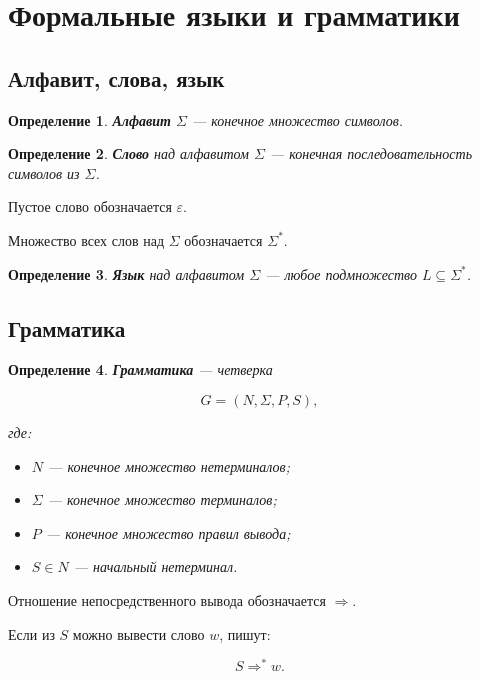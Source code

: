 \documentclass[12pt,a4paper]{article}
\newtheorem{definition}{Определение}
\begin{document}
\section{Формальные языки и грамматики}

\subsection{Алфавит, слова, язык}

\begin{definition}
\textbf{Алфавит} $\Sigma$ --- конечное множество символов.
\end{definition}

\begin{definition}
\textbf{Слово} над алфавитом $\Sigma$ --- конечная последовательность символов из $\Sigma$.
\end{definition}

Пустое слово обозначается $\varepsilon$.

Множество всех слов над $\Sigma$ обозначается $\Sigma^*$.

\begin{definition}
\textbf{Язык} над алфавитом $\Sigma$ --- любое подмножество $L \subseteq \Sigma^*$.
\end{definition}

\subsection{Грамматика}

\begin{definition}
\textbf{Грамматика} --- четверка

\[
G = (N, \Sigma, P, S),
\]

где:
\begin{itemize}
    \item $N$ --- конечное множество нетерминалов;
    \item $\Sigma$ --- конечное множество терминалов;
    \item $P$ --- конечное множество правил вывода;
    \item $S \in N$ --- начальный нетерминал.
\end{itemize}
\end{definition}

Отношение непосредственного вывода обозначается $\Rightarrow$.

Если из $S$ можно вывести слово $w$, пишут:

\[
S \Rightarrow^* w.
\]
\end{document}
